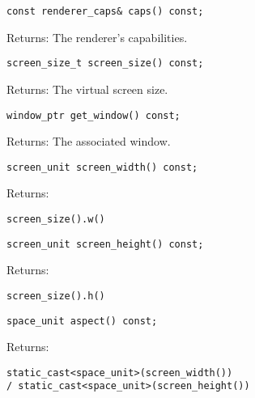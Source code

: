 \documentclass{article}
\begin{document}
\begin{lstlisting}
const renderer_caps& caps() const;
\end{lstlisting}
Returns: The renderer's capabilities.

\begin{lstlisting}
screen_size_t screen_size() const;
\end{lstlisting}
Returns: The virtual screen size.

\begin{lstlisting}
window_ptr get_window() const;
\end{lstlisting}
Returns: The associated window.

\begin{lstlisting}
screen_unit screen_width() const;
\end{lstlisting}
Returns:
\begin{lstlisting}
screen_size().w()
\end{lstlisting}

\begin{lstlisting}
screen_unit screen_height() const;
\end{lstlisting}
Returns:
\begin{lstlisting}
screen_size().h()
\end{lstlisting}

\begin{lstlisting}
space_unit aspect() const;
\end{lstlisting}
Returns:
\begin{lstlisting}
static_cast<space_unit>(screen_width())
/ static_cast<space_unit>(screen_height())
\end{lstlisting}
\end{document}

